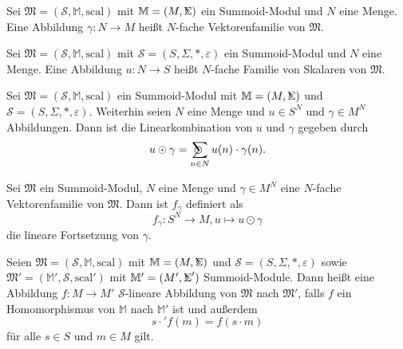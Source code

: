 \documentclass{article}
\DeclareMathOperator*{\Sigmacirc}{%
  \ThisStyle{\mathop{\ensurestackMath{\stackinset{c}{-0.75\LMpt}{c}{}{%
  \rotatebox[origin=lb]{-90}{$\circ$}}{\SavedStyle\Sigma}}}}}
\DeclareMathOperator*{\sumcirc}{%
  \ThisStyle{\mathop{\ensurestackMath{\stackinset{c}{-1.5\LMpt}{c}{}{%
  \rotatebox[origin=lb]{-90}{$\SavedStyle\scalerel*{\bm\Circle}{%
  i}$}}{\SavedStyle\sum}}}}}
\begin{document}
\begin{definition}
  Sei $\mathfrak{M} = (\mathcal{S}, \mathbb{M}, \text{scal})$ mit $\mathbb{M} = (M, \Sigmacirc)$ ein Summoid-Modul und $N$ eine Menge.
  Eine Abbildung $\gamma \colon N \to M$ heißt $N$-fache Vektorenfamilie von $\mathfrak{M}$.
\end{definition}

\begin{definition}
  Sei $\mathfrak{M} = (\mathcal{S}, \mathbb{M}, \text{scal})$ mit $\mathcal{S} = (S, \Sigma, \ast, \varepsilon)$ ein Summoid-Modul und $N$ eine Menge.
  Eine Abbildung $u \colon N \to S$ heißt $N$-fache Familie von Skalaren von $\mathfrak{M}$.
\end{definition}

\begin{definition}
  Sei $\mathfrak{M} = (\mathcal{S}, \mathbb{M}, \text{scal})$ ein Summoid-Modul mit
  $\mathbb{M} = (M, \Sigmacirc)$ und $\mathcal{S} = (S, \Sigma, \ast, \varepsilon)$.
  Weiterhin seien $N$ eine Menge und $u \in S^N$ und $\gamma \in M^N$ Abbildungen.
  Dann ist die Linearkombination von $u$ und $\gamma$ gegeben durch
  \begin{equation*}
    u \odot \gamma = \sumcirc_{n \in N}u(n) \cdot \gamma(n).
  \end{equation*}
\end{definition}

\begin{definition}
  Sei $\mathfrak{M}$ ein Summoid-Modul, $N$ eine Menge und $\gamma \in M^N$ eine $N$-fache Vektorenfamilie von $\mathfrak{M}$.
  Dann ist $f_\gamma$ definiert als
  \begin{equation*}
    f_\gamma \colon S^N \to M, u \mapsto u \odot \gamma
  \end{equation*}
  die lineare Fortsetzung von $\gamma$.
\end{definition}

\begin{definition}
  Seien $\mathfrak{M} = (\mathcal{S}, \mathbb{M}, \text{scal})$
  mit $\mathbb{M} = (M, \Sigmacirc)$
  und $\mathcal{S} = (S, \Sigma, \ast, \varepsilon)$
  sowie $\mathfrak{M}' = (\mathbb{M}', \mathcal{S}, \text{scal}')$
  mit $\mathbb{M}' = (M', \Sigmacirc')$ Summoid-Module.
  Dann heißt eine Abbildung $f \colon M \to M'$ 
  $\mathcal{S}$-lineare Abbildung von $\mathfrak{M}$ nach $\mathfrak{M}'$, 
  falls $f$ ein Homomorphismus von $\mathbb{M}$ nach $\mathbb{M}'$ ist und außerdem
  \begin{equation*}
    s \cdot' f(m) = f(s \cdot m)
  \end{equation*}
  für alle $s \in S$ und $m \in M$ gilt.
\end{definition}
\end{document}
